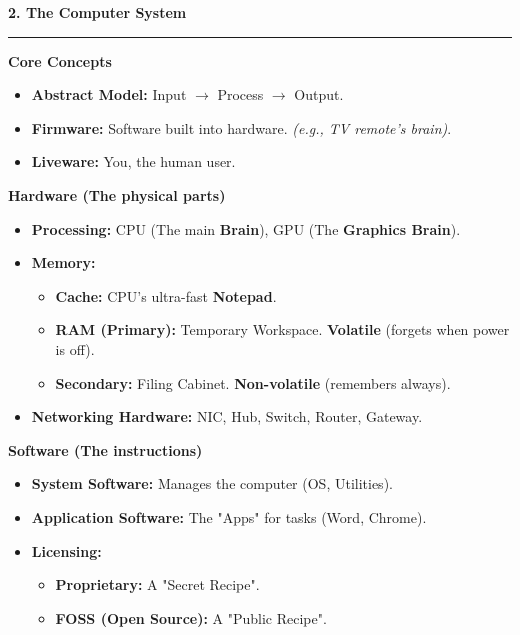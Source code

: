 \documentclass[a4paper, 8pt]{extarticle}
\newcommand{\sectionheading}[1]{\large\textbf{#1}\par\noindent\rule{\linewidth}{0.4pt}}
\newcommand{\subsectionheading}[1]{\normalsize\textbf{#1}}
\begin{document}
\begin{multicols}{2}
\vspace{1em}
\sectionheading{2. The Computer System}
\vspace{0.5em}
\subsectionheading{Core Concepts}
\begin{itemize}
    \item \textbf{Abstract Model:} Input $\rightarrow$ Process $\rightarrow$ Output.
    \item \textbf{Firmware:} Software built into hardware. \textit{(e.g., TV remote's brain)}.
    \item \textbf{Liveware:} You, the human user.
\end{itemize}
\subsectionheading{Hardware (The physical parts)}
\begin{itemize}
    \item \textbf{Processing:} CPU (The main \textbf{Brain}), GPU (The \textbf{Graphics Brain}).
    \item \textbf{Memory:}
    \begin{itemize}
        \item \textbf{Cache:} CPU's ultra-fast \textbf{Notepad}.
        \item \textbf{RAM (Primary):} Temporary Workspace. \textbf{Volatile} (forgets when power is off).
        \item \textbf{Secondary:} Filing Cabinet. \textbf{Non-volatile} (remembers always).
    \end{itemize}
    \item \textbf{Networking Hardware:} NIC, Hub, Switch, Router, Gateway.
\end{itemize}
\subsectionheading{Software (The instructions)}
\begin{itemize}
    \item \textbf{System Software:} Manages the computer (OS, Utilities).
    \item \textbf{Application Software:} The "Apps" for tasks (Word, Chrome).
    \item \textbf{Licensing:}
    \begin{itemize}
        \item \textbf{Proprietary:} A "Secret Recipe".
        \item \textbf{FOSS (Open Source):} A "Public Recipe".
    \end{itemize}
\end{itemize}

\columnbreak %



\end{multicols}
\end{document}
